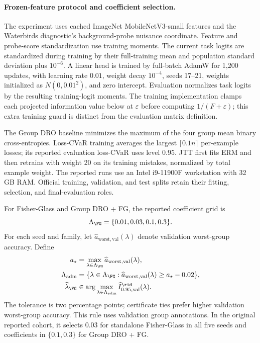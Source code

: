 \paragraph{Frozen-feature protocol and coefficient selection.}
The experiment uses cached ImageNet MobileNetV3-small features and the Waterbirds diagnostic's background-probe nuisance coordinate. Feature and probe-score standardization use training moments. The current task logits are standardized during training by their full-training mean and population standard deviation plus $10^{-6}$. A linear head is trained by full-batch AdamW for 1,200 updates, with learning rate $0.01$, weight decay $10^{-4}$, seeds 17--21, weights initialized as $N(0,0.01^2)$, and zero intercept. Evaluation normalizes task logits by the resulting training-logit moments. The training implementation clamps each projected information value below at $\varepsilon$ before computing $1/(F+\varepsilon)$; this extra training guard is distinct from the evaluation matrix definition.

The Group DRO baseline minimizes the maximum of the four group mean binary cross-entropies. Loss-CVaR training averages the largest $\lceil0.1n\rceil$ per-example losses; its reported evaluation loss-CVaR uses level $0.95$. JTT first fits ERM and then retrains with weight 20 on its training mistakes, normalized by total example weight. The reported runs use an Intel i9-11900F workstation with 32\,GB RAM. Official training, validation, and test splits retain their fitting, selection, and final-evaluation roles.

For Fisher-Glass and Group DRO + FG, the reported coefficient grid is
\begin{equation}
\Lambda_{\FG}=\{0.01,0.03,0.1,0.3\}.
\end{equation}
For each seed and family, let $\widehat a_{\mathrm{worst,val}}(\lambda)$ denote validation worst-group accuracy. Define
\begin{equation}
\begin{split}
a_\star&=\max_{\lambda\in\Lambda_{\FG}}
\widehat a_{\mathrm{worst,val}}(\lambda),\\
\Lambda_{\mathrm{adm}}&=\{\lambda\in\Lambda_{\FG}:
\widehat a_{\mathrm{worst,val}}(\lambda)\geq a_\star-0.02\},\\
\widehat\lambda_{\FG}&\in\arg\max_{\lambda\in\Lambda_{\mathrm{adm}}}
\widehat I_{0.95,\mathrm{val}}^{\rid}(\lambda).
\end{split}
\end{equation}
The tolerance is two percentage points; certificate ties prefer higher validation worst-group accuracy. This rule uses validation group annotations. In the original reported cohort, it selects $0.03$ for standalone Fisher-Glass in all five seeds and coefficients in $\{0.1,0.3\}$ for Group DRO + FG.

